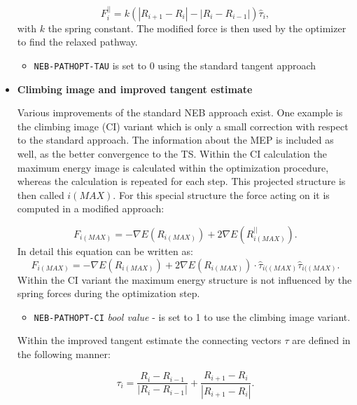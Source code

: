 \documentclass[10pt,a4paper]{article} %
\begin{document}
\begin{itemize}
	\begin{equation}
	F^{||}_{i}=k\left(\left|R_{i+1}-R_{i}\right|-\left|R_{i}-R_{i-1}\right|\right)\hat{\tau}_{i},
	\end{equation}
	with $k$ the spring constant. The modified force is then used by the optimizer to find the relaxed pathway. 
	
	\begin{itemize}
		
		\item \texttt{NEB-PATHOPT-TAU} is set to 0 using the standard tangent approach 
		
	\end{itemize}
	
	
	\item \textbf{Climbing image and improved tangent estimate}
	
	Various improvements of the standard NEB approach exist. One example is the climbing image (CI) variant which is only a small correction with respect to the standard approach. The information about the MEP is included as well, as the better convergence to the TS. Within the CI calculation the maximum energy image is calculated within the optimization procedure, whereas the calculation is repeated for each step. This projected structure is then called $i(MAX)$. For this special structure the force acting on it is computed in a modified approach:
	
	\begin{equation}
	F_{i(MAX)}=-\nabla E(R_{i(MAX)})+2 \nabla E(R^{||}_{i(MAX)}).
	\end{equation}
	In detail this equation can be written as:
	\begin{equation}
	F_{i(MAX)}=-\nabla E(R_{i(MAX)})+2\nabla E(R_{i(MAX)})\cdot \hat{\tau}_{i((MAX)}\hat{\tau}_{i((MAX)}.
	\end{equation}
	Within the CI variant the maximum energy structure is not influenced by the spring forces during the optimization step. 
	
	\begin{itemize}
		
		\item \texttt{NEB-PATHOPT-CI} \textit{bool value} - is set to 1 to use the climbing image variant.
		
	\end{itemize}
	
	Within the improved tangent estimate the connecting vectors $\tau$ are defined in the following manner:
	
	\begin{equation}
	\tau_{i}=\frac{R_{i}-R_{i-1}}{\left|R_{i}-R_{i-1}\right|}+\frac{R_{i+1}-R_{i}}{\left|R_{i+1}-R_{i}\right|}.
	\end{equation}
	

\end{itemize}
\end{document}

